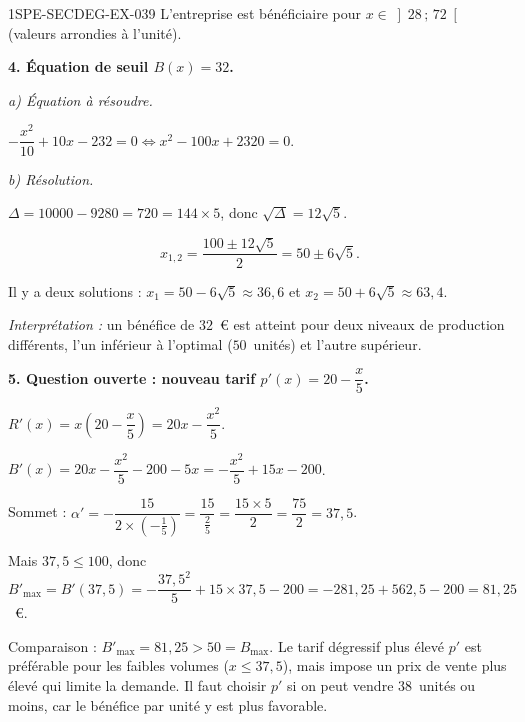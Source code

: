 \begin{corrige}{1SPE-SECDEG-EX-039}
L'entreprise est bénéficiaire pour $x \in \left]28\,;\,72\right[$ (valeurs arrondies à l'unité).

\medskip
\textbf{4. Équation de seuil $B(x) = 32$.}

\textit{a) Équation à résoudre.}


$-\dfrac{x^2}{10} + 10x - 232 = 0 \iff x^2 - 100x + 2320 = 0$.

\textit{b) Résolution.}

$\Delta = 10000 - 9280 = 720 = 144 \times 5$, donc $\sqrt{\Delta} = 12\sqrt{5}$.

\[x_{1,2} = \frac{100 \pm 12\sqrt{5}}{2} = 50 \pm 6\sqrt{5}.\]

Il y a deux solutions : $x_1 = 50 - 6\sqrt{5} \approx 36{,}6$ et $x_2 = 50 + 6\sqrt{5} \approx 63{,}4$.

\textit{Interprétation :} un bénéfice de $32$~\euro{} est atteint pour deux niveaux de production différents, l'un inférieur à l'optimal ($50$~unités) et l'autre supérieur.

\medskip
\textbf{5. Question ouverte : nouveau tarif $p'(x) = 20 - \dfrac{x}{5}$.}


$R'(x) = x\!\left(20 - \dfrac{x}{5}\right) = 20x - \dfrac{x^2}{5}$.

$B'(x) = 20x - \dfrac{x^2}{5} - 200 - 5x = -\dfrac{x^2}{5} + 15x - 200$.

Sommet : $\alpha' = -\dfrac{15}{2 \times (-\frac{1}{5})} = \dfrac{15}{\frac{2}{5}} = \dfrac{15 \times 5}{2} = \dfrac{75}{2} = 37{,}5$.

Mais $37{,}5 \leqslant 100$, donc $B'_{\max} = B'(37{,}5) = -\dfrac{37{,}5^2}{5} + 15 \times 37{,}5 - 200 = -281{,}25 + 562{,}5 - 200 = 81{,}25$~\euro.

Comparaison : $B'_{\max} = 81{,}25 > 50 = B_{\max}$. Le tarif dégressif plus élevé $p'$ est préférable pour les faibles volumes ($x \leqslant 37{,}5$), mais impose un prix de vente plus élevé qui limite la demande. Il faut choisir $p'$ si on peut vendre $38$~unités ou moins, car le bénéfice par unité y est plus favorable.

\end{corrige}

